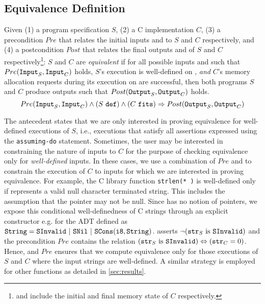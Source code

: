 \subsection{Equivalence Definition}
\label{sec:eqdef}
Given (1) a \SpecL{} program specification $S$, (2) a C implementation $C$,
(3) a precondition $Pre$ that relates the initial inputs  and  to
$S$ and $C$ respectively, and (4) a postcondition $Post$ that relates the final outputs
 and  of $S$ and $C$ respectively\footnote{ and 
include the initial and final memory state of $C$ respectively.}:
$S$ and $C$ are {\em equivalent} if for all possible inputs  and  such that
$Pre({\tt Input}_{S},{\tt Input}_{C})$ holds,
$S$'s execution is well-defined on , {\em and}
$C$'s memory allocation requests during its execution on  are successful,
then both programs $S$ and $C$ produce outputs such that $Post({\tt Output}_{S},{\tt Output}_{C})$ holds.
$$
Pre({\tt Input}_{S},{\tt Input}_{C}) \land {(S\ {\tt def})}{} \land {(C\ {\tt fits})}{} \Rightarrow Post({\tt Output}_{S},{\tt Output}_{C})
$$

The \sdef{} antecedent states that we are only interested in proving equivalence for
well-defined executions of $S$, i.e., executions that satisfy all assertions expressed
using the {\tt assuming-do} statement.
Sometimes, the user may be interested in constraining the nature of inputs to $C$
for the purpose of checking equivalence only for {\em well-defined} inputs.
In these cases, we use a combination of $Pre$ and \sdef{} to constrain
the execution of $C$ to inputs for which we are interested in proving equivalence.
For example, the C library function {\tt strlen(* )} is well-defined only if 
represents a valid null character terminated string.
This includes the assumption that the pointer  may not be null.
Since \SpecL{} has no notion of pointers, we expose this conditional well-definedness of C strings
through an explicit constructor e.g.  for the  ADT defined as
$\type{String}=\cons{SInvalid}\ |\ \cons{SNil}\ |\ \cons{SCons}(\type{i8}, \type{String})$.
\sdef{} asserts $\neg({\tt str}_{S}\ \mathrm{is}\ {\tt SInvalid})$ and
the precondition $Pre$ contains the relation $({\tt str}_{S}\ \mathrm{is}\ {\tt SInvalid}) \Leftrightarrow ({\tt str}_{C}=0)$.
Hence, \sdef{} and $Pre$ ensures that we compute equivalence only for those
executions of $S$ and $C$ where the input strings are well-defined.
A similar strategy is employed for other functions as detailed in \cref{sec:results}.

